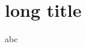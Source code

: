 \documentclass{beamer}
\begin{document}
\begin{frame}
    \tableofcontents
\end{frame}

\section[short title]{long title}   
\begin{frame}
    abc
\end{frame} 
\end{document}
